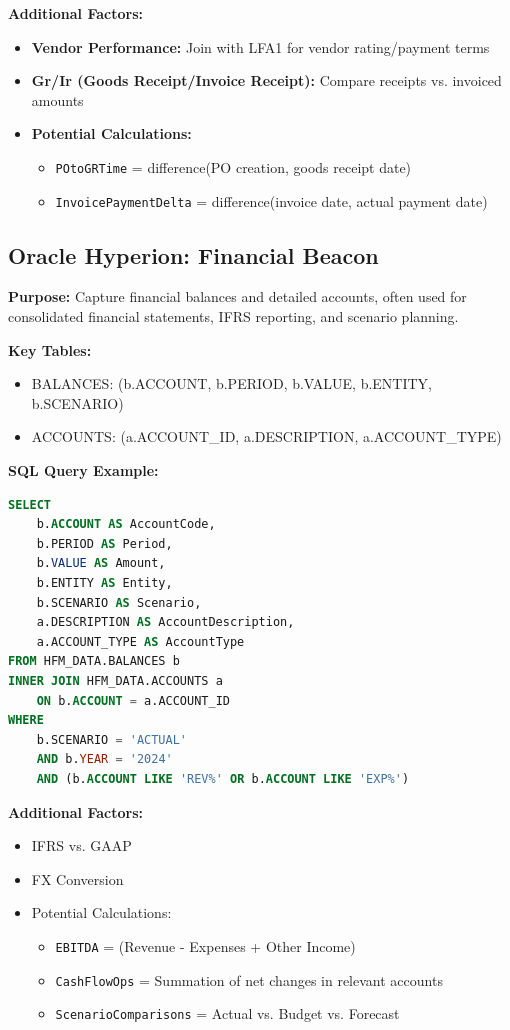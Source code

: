 \documentclass[a4paper,10pt]{article}
\begin{document}
\textbf{Additional Factors:}
\begin{itemize}[leftmargin=2em]
    \item \textbf{Vendor Performance:} Join with LFA1 for vendor rating/payment terms
    \item \textbf{Gr/Ir (Goods Receipt/Invoice Receipt):} Compare receipts vs. invoiced amounts
    \item \textbf{Potential Calculations:}
    \begin{itemize}[leftmargin=1.5em]
        \item \texttt{POtoGRTime} = difference(PO creation, goods receipt date)
        \item \texttt{InvoicePaymentDelta} = difference(invoice date, actual payment date)
    \end{itemize}
\end{itemize}

\subsection{Oracle Hyperion: Financial Beacon}
\textbf{Purpose:} Capture financial balances and detailed accounts, often used for consolidated financial statements, IFRS reporting, and scenario planning.

\textbf{Key Tables:}
\begin{itemize}[leftmargin=2em]
    \item BALANCES: (b.ACCOUNT, b.PERIOD, b.VALUE, b.ENTITY, b.SCENARIO)
    \item ACCOUNTS: (a.ACCOUNT\_ID, a.DESCRIPTION, a.ACCOUNT\_TYPE)
\end{itemize}

\textbf{SQL Query Example:}
\begin{lstlisting}[language=SQL]
SELECT 
    b.ACCOUNT AS AccountCode,
    b.PERIOD AS Period,
    b.VALUE AS Amount,
    b.ENTITY AS Entity,
    b.SCENARIO AS Scenario,
    a.DESCRIPTION AS AccountDescription,
    a.ACCOUNT_TYPE AS AccountType
FROM HFM_DATA.BALANCES b
INNER JOIN HFM_DATA.ACCOUNTS a
    ON b.ACCOUNT = a.ACCOUNT_ID
WHERE 
    b.SCENARIO = 'ACTUAL'
    AND b.YEAR = '2024'
    AND (b.ACCOUNT LIKE 'REV%' OR b.ACCOUNT LIKE 'EXP%')
\end{lstlisting}

\textbf{Additional Factors:}
\begin{itemize}[leftmargin=2em]
    \item IFRS vs. GAAP
    \item FX Conversion
    \item Potential Calculations:
    \begin{itemize}[leftmargin=1.5em]
        \item \texttt{EBITDA} = (Revenue - Expenses + Other Income)
        \item \texttt{CashFlowOps} = Summation of net changes in relevant accounts
        \item \texttt{ScenarioComparisons} = Actual vs. Budget vs. Forecast
    \end{itemize}
\end{itemize}
\end{document}
